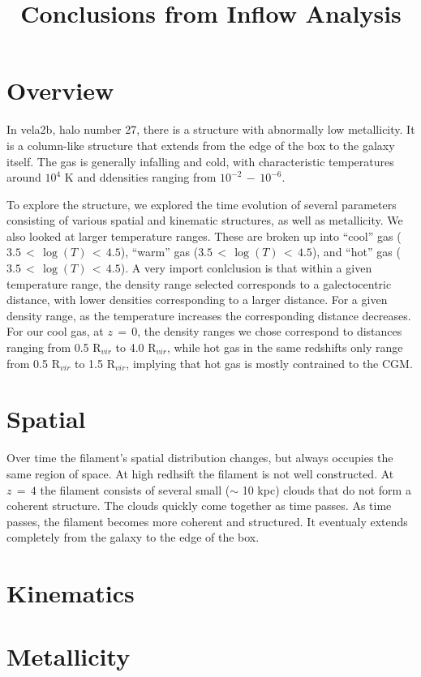 \documentclass{article}
\title{Conclusions from Inflow Analysis}
\begin{document}
\maketitle



\section{Overview}

In vela2b, halo number 27, there is a structure with abnormally low
metallicity.  It is a column-like structure that extends from the edge of the 
box to the galaxy itself. The gas is generally infalling and cold, with  
characteristic temperatures around $10^4$ K and ddensities ranging from 
$10^{-2}\,-\,10^{-6}$.


To explore the structure, we explored the time evolution of several parameters
consisting of various spatial and kinematic structures, as well as metallicity.
We also looked at larger temperature ranges. These are broken up into ``cool''
gas ($3.5\,<\,\log(T)\,<\,4.5$), ``warm'' gas ($3.5\,<\,\log(T)\,<\,4.5$), and
``hot'' gas ($3.5\,<\,\log(T)\,<\,4.5$). A very import conlclusion is that
within a given temperature range, the density range selected corresponds to a
galectocentric distance, with lower densities corresponding to a larger
distance. For a given density range, as the temperature increases the
corresponding distance decreases. For our cool gas, at $z\,=\,0$, the density
ranges we chose correspond to distances ranging from 0.5 R$_{vir}$ to 4.0
R$_{vir}$, while hot gas in the same redshifts only range from 0.5 R$_{vir}$
to 1.5 R$_{vir}$, implying that hot gas is mostly contrained to the CGM. 



\section{Spatial}
Over time the filament's spatial distribution changes, but always occupies the same 
region of space. At high redhsift the filament is not well constructed. At $z\,=\,4$
the filament consists of several small ($\sim$ 10 kpc) clouds that do not form a
coherent structure. The clouds quickly come together as time passes. As time
passes, the filament becomes more coherent and structured. It eventualy extends
completely from the galaxy to the edge of the box. 





\section{Kinematics}



\section{Metallicity}
\end{document}
